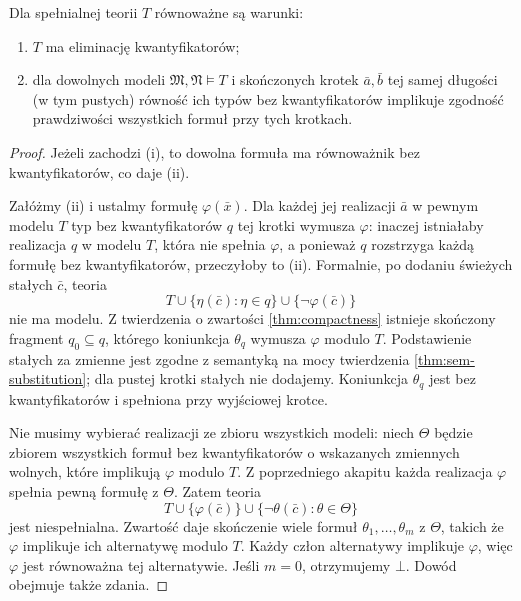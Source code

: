 \begin{twierdzenie}
\label{thm:mod-qe-semantic}
Dla spełnialnej teorii $T$ równoważne są warunki:
\begin{enumerate}[label=(\roman*)]
\item $T$ ma eliminację kwantyfikatorów;
\item dla dowolnych modeli $\mathfrak M,\mathfrak N\models T$
i skończonych krotek $\bar a,\bar b$ tej samej długości
(w tym pustych) równość ich typów bez kwantyfikatorów
implikuje zgodność prawdziwości wszystkich formuł
przy tych krotkach.
\end{enumerate}
\end{twierdzenie}
\begin{proof}
Jeżeli zachodzi (i), to dowolna formuła ma równoważnik
bez kwantyfikatorów, co daje (ii).

Załóżmy (ii) i ustalmy formułę $\varphi(\bar x)$.
Dla każdej jej realizacji $\bar a$ w pewnym modelu $T$
typ bez kwantyfikatorów $q$ tej krotki wymusza
$\varphi$: inaczej istniałaby realizacja $q$ w modelu $T$,
która nie spełnia $\varphi$, a ponieważ $q$ rozstrzyga
każdą formułę bez kwantyfikatorów, przeczyłoby to (ii).
Formalnie, po dodaniu świeżych stałych $\bar c$,
teoria
\[
T\cup\{\eta(\bar c):\eta\in q\}
  \cup\{\neg\varphi(\bar c)\}
\]
nie ma modelu. Z twierdzenia o zwartości
\ref{thm:compactness} istnieje skończony fragment
$q_0\subseteq q$, którego koniunkcja $\theta_q$ wymusza
$\varphi$ modulo $T$. Podstawienie stałych za zmienne
jest zgodne z semantyką na mocy twierdzenia
\ref{thm:sem-substitution}; dla pustej krotki stałych
nie dodajemy. Koniunkcja $\theta_q$ jest bez kwantyfikatorów
i spełniona przy wyjściowej krotce.

Nie musimy wybierać realizacji ze zbioru wszystkich modeli:
niech $\Theta$ będzie zbiorem wszystkich formuł bez
kwantyfikatorów o wskazanych zmiennych wolnych, które
implikują $\varphi$ modulo $T$. Z poprzedniego akapitu
każda realizacja $\varphi$ spełnia pewną formułę z $\Theta$.
Zatem teoria
\[
T\cup\{\varphi(\bar c)\}
  \cup\{\neg\theta(\bar c):\theta\in\Theta\}
\]
jest niespełnialna. Zwartość daje skończenie wiele formuł
$\theta_1,\ldots,\theta_m$ z $\Theta$, takich że
$\varphi$ implikuje ich alternatywę modulo $T$.
Każdy człon alternatywy implikuje $\varphi$, więc
$\varphi$ jest równoważna tej alternatywie. Jeśli
$m=0$, otrzymujemy $\bot$. Dowód obejmuje także zdania.
\end{proof}

